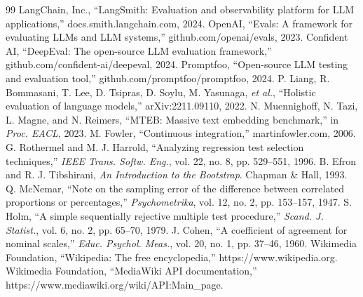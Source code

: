 \documentclass[conference]{IEEEtran}
\begin{document}
\begin{thebibliography}{99}
 LangChain, Inc., ``LangSmith: Evaluation and observability platform for LLM applications,'' docs.smith.langchain.com, 2024.
 OpenAI, ``Evals: A framework for evaluating LLMs and LLM systems,'' github.com/openai/evals, 2023.
 Confident AI, ``DeepEval: The open-source LLM evaluation framework,'' github.com/confident-ai/deepeval, 2024.
 Promptfoo, ``Open-source LLM testing and evaluation tool,'' github.com/promptfoo/promptfoo, 2024.
 P. Liang, R. Bommasani, T. Lee, D. Tsipras, D. Soylu, M. Yasunaga, \emph{et al.}, ``Holistic evaluation of language models,'' arXiv:2211.09110, 2022.
 N. Muennighoff, N. Tazi, L. Magne, and N. Reimers, ``MTEB: Massive text embedding benchmark,'' in \emph{Proc. EACL}, 2023.
 M. Fowler, ``Continuous integration,'' martinfowler.com, 2006.
 G. Rothermel and M. J. Harrold, ``Analyzing regression test selection techniques,'' \emph{IEEE Trans. Softw. Eng.}, vol. 22, no. 8, pp. 529--551, 1996.
 B. Efron and R. J. Tibshirani, \emph{An Introduction to the Bootstrap}. Chapman \& Hall, 1993.
 Q. McNemar, ``Note on the sampling error of the difference between correlated proportions or percentages,'' \emph{Psychometrika}, vol. 12, no. 2, pp. 153--157, 1947.
 S. Holm, ``A simple sequentially rejective multiple test procedure,'' \emph{Scand. J. Statist.}, vol. 6, no. 2, pp. 65--70, 1979.
 J. Cohen, ``A coefficient of agreement for nominal scales,'' \emph{Educ. Psychol. Meas.}, vol. 20, no. 1, pp. 37--46, 1960.
 Wikimedia Foundation, ``Wikipedia: The free encyclopedia,'' https://www.wikipedia.org.
 Wikimedia Foundation, ``MediaWiki API documentation,'' https://www.mediawiki.org/wiki/API:Main\_page.
\end{thebibliography}
\end{document}
